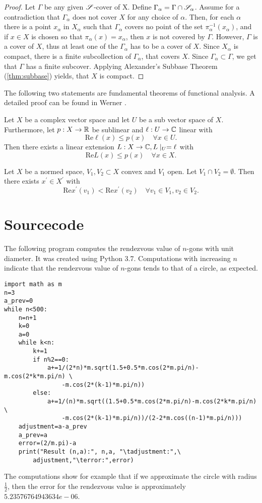 \begin{appendices}
\begin{proof}
	Let $\Gamma$ be any given $\mathscr{S}$-cover of X. Define $\Gamma_\alpha=\Gamma\cap \mathscr{S}_\alpha$. Assume for a contradiction that $\Gamma_\alpha$ does not cover $X$ for any choice of $\alpha$. Then, for each $\alpha$ there is a point $x_\alpha$ in $X_\alpha$ such that $\Gamma_\alpha$ covers no point of the set $\pi_\alpha^{-1}(x_\alpha)$, and if $x\in X$ is chosen so that $\pi_\alpha(x)=x_\alpha$, then $x$ is not covered by $\Gamma$. However, $\Gamma$ is a cover of $X$, thus at least one of the $\Gamma_\alpha$ has to be a cover of $X$. Since $X_\alpha$ is compact, there is a finite subcollection of $\Gamma_\alpha$, that covers $X$. Since $\Gamma_\alpha\subset\Gamma$, we get that $\Gamma$ has a finite subcover. Applying Alexander's Subbase Theorem (\autoref{thm:subbase}) yields, that $X$ is compact.
\end{proof}


The following two statements are fundamental theorems of functional analysis. A detailed proof can be found in Werner \cite{werner:funkana}.
\begin{theorem}
	Let $X$ be a complex vector space and let $U$ be a sub vector space of $X$. Furthermore, let $p:X\to \mathbb{R}$ be sublinear and $\ell:U\to \mathbb{C}$ linear with
	\[
	\mathrm{Re}\ell(x)\leq p(x)\quad \forall x\in U.
	\]
	Then there exists a linear extension $L:X\to \mathbb{C}, L\mid_U=\ell$ with
	\[
	\mathrm{Re}L(x)\leq p(x)\quad \forall x\in X.
	\]
\end{theorem}


\begin{corollary}\label{thm:banach-separation}
	Let $X$ be a normed space, $V_1,V_2\subset X$ convex and $V_1$ open. Let $V_1\cap V_2=\emptyset$. Then there exists $x^\prime\in X^\prime$ with\[
	\mathrm{Re}x^\prime(v_1)<\mathrm{Re}x^\prime(v_2)\quad \forall v_1\in V_1,v_2\in V_2.
	\]
\end{corollary}

\chapter{Sourcecode}\label{sourcecode}
The following program computes the rendezvous value of $n$-gons with unit diameter. It was created using Python 3.7. Computations with increasing $n$ indicate that the rendezvous value of $n$-gons tends to that of a circle, as expected.
\begin{verbatim}
import math as m
n=3
a_prev=0
while n<500:
    n=n+1
    k=0
    a=0
    while k<n:
        k+=1
        if n%2==0:
            a+=1/(2*n)*m.sqrt(1.5+0.5*m.cos(2*m.pi/n)-m.cos(2*k*m.pi/n) \
                -m.cos(2*(k-1)*m.pi/n))
        else:
            a+=1/(n)*m.sqrt((1.5+0.5*m.cos(2*m.pi/n)-m.cos(2*k*m.pi/n) \
                -m.cos(2*(k-1)*m.pi/n))/(2-2*m.cos((n-1)*m.pi/n)))
    adjustment=a-a_prev
    a_prev=a
    error=(2/m.pi)-a
    print("Result (n,a):", n,a, "\tadjustment:",\
        adjustment,"\terror:",error)
\end{verbatim}

The computations show for example that if we approximate the circle with radius $\frac{1}{2}$, then the error for the rendezvous value is approximately $5.23576764943634e-06$.
\end{appendices}